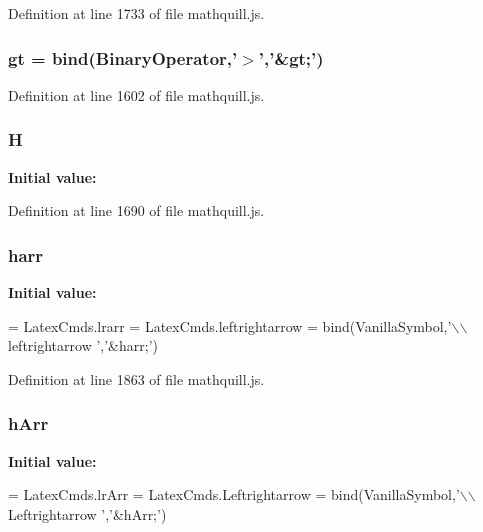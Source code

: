 Definition at line 1733 of file mathquill.\-js.

\subsubsection[{gt}]{ gt = {\bf bind}({\bf Binary\-Operator},'$>$','\&gt;')}\label{mathquill_8js_afcd9bd0e48d31b4d384b46d471e50ab4}


Definition at line 1602 of file mathquill.\-js.

\subsubsection[{H}]{ H}\label{mathquill_8js_a1089cf02a446af28543660ee2e754bf4}
{\bfseries Initial value\-:}


Definition at line 1690 of file mathquill.\-js.

\subsubsection[{harr}]{ harr}\label{mathquill_8js_a8879b3be018b2af75db03ff79e4a0a55}
{\bfseries Initial value\-:}
\begin{DoxyCode}
= LatexCmds.lrarr = LatexCmds.leftrightarrow =
  bind(VanillaSymbol,\textcolor{stringliteral}{'\(\backslash\)\(\backslash\)leftrightarrow '},\textcolor{stringliteral}{'&harr;'})
\end{DoxyCode}


Definition at line 1863 of file mathquill.\-js.

\subsubsection[{h\-Arr}]{ h\-Arr}\label{mathquill_8js_a1b94f57e1102a9a0bacd0022f285ff4f}
{\bfseries Initial value\-:}
\begin{DoxyCode}
= LatexCmds.lrArr = LatexCmds.Leftrightarrow =
  bind(VanillaSymbol,\textcolor{stringliteral}{'\(\backslash\)\(\backslash\)Leftrightarrow '},\textcolor{stringliteral}{'&hArr;'})
\end{DoxyCode}


